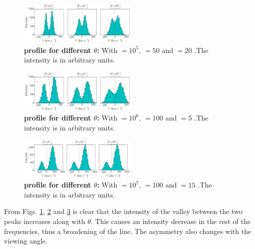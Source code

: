 \documentclass[twocolappendix]{latex/emulateapj}
\begin{document}
\begin{figure}[h!]
	\begin{center}
		\includegraphics[width=0.5\textwidth]{./figures/influence_viewing_angle_5}
	\end{center}
	\caption{\textbf{\lya profile for different $\theta$:} With \tauh$=10^5$, \vrot$=50$ \kms and \vout$=20$ \kms.The intensity is in arbitrary units.
		\label{fig:influence_viewing_angle_5}}
\end{figure}

\begin{figure}[h!]
	\begin{center}
		\includegraphics[width=0.5\textwidth]{./figures/influence_viewing_angle_6}
	\end{center}
	\caption{\textbf{\lya profile for different $\theta$:} With \tauh$=10^6$, \vrot$=100$ \kms and \vout$=5$ \kms.The intensity is in arbitrary units.
		\label{fig:influence_viewing_angle_6}}
\end{figure}

\begin{figure}[h!]
	\begin{center}
		\includegraphics[width=0.5\textwidth]{./figures/influence_viewing_angle_7}
	\end{center}
	\caption{\textbf{\lya profile for different $\theta$:} With \tauh$=10^7$, \vrot$=100$ \kms and \vout$=15$ \kms.The intensity is in arbitrary units.
		\label{fig:influence_viewing_angle_7}}
\end{figure}

From Figs. \ref{fig:influence_viewing_angle_5}, \ref{fig:influence_viewing_angle_6} and \ref{fig:influence_viewing_angle_7} is clear that the intensity of the valley between the two peaks increases along with $\theta$. This causes an intensity decrease in the rest of the frequencies, thus a broadening of the line. The asymmetry also changes with the viewing angle.\\
\end{document}
